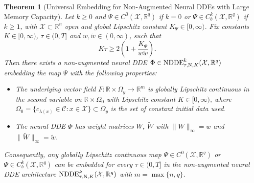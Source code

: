 \documentclass[10pt]{article}
\numberwithin{equation}{section}
\newtheorem{theorem}{Theorem}[section]
\newcommand\normm[1]{\big\lVert#1\big\lVert}
\begin{document}
	\begin{theorem}[Universal Embedding for Non-Augmented Neural DDEs with Large Memory Capacity] \label{th:universal_embedding}
		Let $k \geq 0$ and $\Psi\in C^0(\mathcal{X}, \mathbb{R}^q)$ if $k = 0$ or $\Psi\in C^k_b(\mathcal{X},\mathbb{R}^q)$ if $k\geq 1$, with $\mathcal{X}\subset \mathbb{R}^n$ open and global Lipschitz constant $K_\Psi\in[0,\infty)$. Fix constants $K \in [0,\infty)$, $\tau\in(0,T]$ and $w,\tilde{w}\in(0,\infty)$, such that $$K\tau  \geq2\left(1+\frac{K_\Psi}{w \tilde{w}}\right).$$ Then there exists a non-augmented neural DDE $\Phi \in \textup{NDDE}_{\tau,\textup{N},K}^k(\mathcal{X},\mathbb{R}^q)$ embedding the map $\Psi$ with the following properties: 
		\begin{itemize}
			\item The underlying vector field $F: \mathbb{R}\times \Omega_y\rightarrow \mathbb{R}^m$ is globally Lipschitz continuous in the second variable on $\mathbb{R}\times \Omega_0$  with Lipschitz constant $K\in[0,\infty)$, where $\Omega_0 = \{c_{\lambda(x)}\in\mathcal{C}: x\in\mathcal{X}\}\subset \Omega_y$ is the set of constant initial data used.
			\item The neural DDE $\Phi$ has weight matrices $W$, $\widetilde{W}$ with $\normm{W}_\infty = w$ and $\normm{\widetilde{W}}_\infty = \tilde w$.
		\end{itemize}
		Consequently, any globally Lipschitz continuous map $\Psi\in C^0(\mathcal{X},\mathbb{R}^q)$ or $\Psi\in  C^k_b(\mathcal{X},\mathbb{R}^q)$ can be embedded for every $\tau \in (0,T]$ in the non-augmented neural DDE architecture $\textup{NDDE}^k_{\tau,\textup{N},K}(\mathcal{X},\mathbb{R}^q)$ with $m = \max\{n,q\}$.
	\end{theorem}
	
\end{document}
